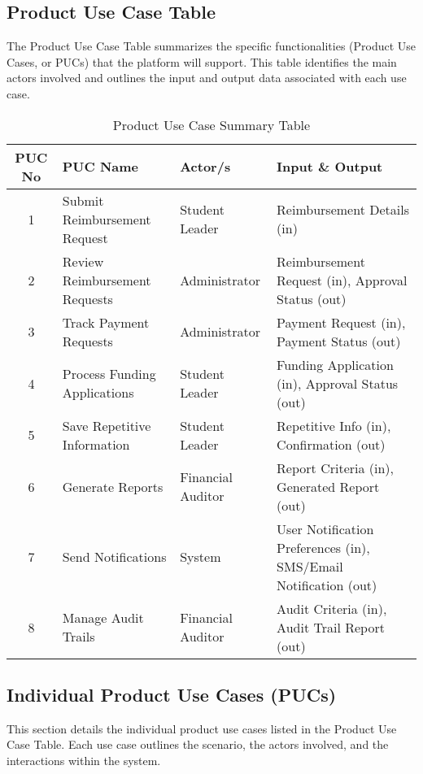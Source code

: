 \documentclass[12pt]{article}
\begin{document}
\subsection{Product Use Case Table}
The Product Use Case Table summarizes the specific functionalities (Product Use Cases, or PUCs) that the platform will support. This table identifies the main actors involved and outlines the input and output data associated with each use case.

\begin{table}[h]
    \centering
    \caption{Product Use Case Summary Table}
    \begin{tabular}{|c|l|l|l|}
        \hline
        \textbf{PUC No} & \textbf{PUC Name} & \textbf{Actor/s} & \textbf{Input \& Output} \\ \hline
        1 & Submit Reimbursement Request & Student Leader & Reimbursement Details (in) \\ \hline
        2 & Review Reimbursement Requests & Administrator & Reimbursement Request (in), Approval Status (out) \\ \hline
        3 & Track Payment Requests & Administrator & Payment Request (in), Payment Status (out) \\ \hline
        4 & Process Funding Applications & Student Leader & Funding Application (in), Approval Status (out) \\ \hline
        5 & Save Repetitive Information & Student Leader & Repetitive Info (in), Confirmation (out) \\ \hline
        6 & Generate Reports & Financial Auditor & Report Criteria (in), Generated Report (out) \\ \hline
        7 & Send Notifications & System & User Notification Preferences (in), SMS/Email Notification (out) \\ \hline
        8 & Manage Audit Trails & Financial Auditor & Audit Criteria (in), Audit Trail Report (out) \\ \hline
    \end{tabular}
\end{table}

\subsection{Individual Product Use Cases (PUCs)}
This section details the individual product use cases listed in the Product Use Case Table. Each use case outlines the scenario, the actors involved, and the interactions within the system.
\end{document}
